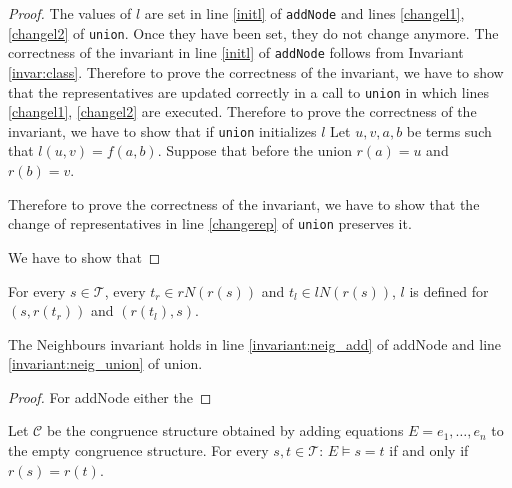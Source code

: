 \begin{proof}

The values of $l$ are set in line \ref{initl} of \texttt{addNode} and lines \ref{changel1}, \ref{changel2} of \texttt{union}. 
Once they have been set, they do not change anymore.
The correctness of the invariant in line \ref{initl} of \texttt{addNode} follows from Invariant \ref{invar:class}.
Therefore to prove the correctness of the invariant, we have to show that the representatives are updated correctly in a call to \texttt{union} in which lines \ref{changel1}, \ref{changel2} are executed.
Therefore to prove the correctness of the invariant, we have to show that if \texttt{union} initializes $l$
Let $u,v,a,b$ be terms such that $l(u,v) = f(a,b)$.
Suppose that before the union $r(a) = u$ and $r(b) = v$.

Therefore to prove the correctness of the invariant, we have to show that the change of representatives in line \ref{changerep} of \texttt{union} preserves it.

We have to show that 

\end{proof}


\begin{invariant}[Neighbours]

For every $s \in \mathcal{T}$, every $t_r \in rN(r(s))$ and $t_l \in lN(r(s))$, $l$ is defined for $(s,r(t_r))$ and $(r(t_l),s)$.

\end{invariant}

\begin{proposition}

The Neighbours invariant holds in line \ref{invariant:neig_add} of addNode and line \ref{invariant:neig_union} of union.

\end{proposition}

\begin{proof}

For addNode either the 

\end{proof}

\begin{proposition}[Correctness]

Let $\mathcal{C}$ be the congruence structure obtained by adding equations $E = e_1, \ldots, e_n$ to the empty congruence structure.
For every $s,t \in \mathcal{T}$: $E \models s = t$ if and only if $r(s) = r(t)$.

\end{proposition}


